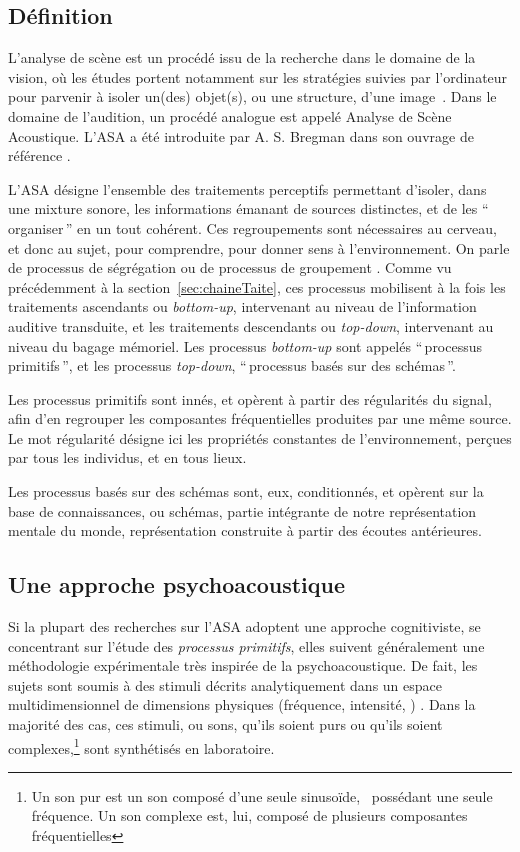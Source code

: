 
\subsection{Définition}
\label{sec:ASAintro}

L'analyse de scène est un procédé issu de la recherche dans le domaine de la vision, où les études portent notamment sur les stratégies suivies par l'ordinateur pour parvenir à isoler un(des) objet(s), ou une structure, d'une image~\citep[p. 12]{mcadams1994penser}. Dans le domaine de l'audition, un procédé analogue est appelé Analyse de Scène Acoustique. L'ASA a été introduite par A. S. Bregman dans son ouvrage de référence \citep{bregman1994auditory}.

L'ASA désigne l'ensemble des traitements perceptifs permettant d'isoler, dans une mixture sonore, les informations émanant de sources distinctes, et de les ``\,organiser\,'' en un tout cohérent. Ces regroupements sont nécessaires au cerveau, et donc au sujet, pour comprendre, pour donner sens à l'environnement. On parle de processus de ségrégation ou de processus de groupement \citep{winkler2009modeling}. Comme vu précédemment à la section~\ref{sec:chaineTaite}, ces processus mobilisent à la fois les traitements ascendants ou \emph{bottom-up}, intervenant au niveau de l'information auditive transduite, et les traitements descendants ou \emph{top-down}, intervenant au niveau du bagage mémoriel. Les processus \emph{bottom-up} sont appelés ``\,processus primitifs\,'', et les processus  \emph{top-down}, ``\,processus basés sur des schémas\,''. 

Les processus primitifs sont innés, et opèrent à partir des régularités du signal, afin d'en regrouper les composantes fréquentielles produites par une même source. Le mot régularité désigne ici les propriétés constantes de l'environnement, perçues par tous les individus, et en tous lieux.

Les processus basés sur des schémas sont, eux, conditionnés, et opèrent sur la base de connaissances, ou schémas, partie intégrante de notre représentation mentale du monde, représentation construite à partir des écoutes antérieures. 
 
\subsection{Une approche psychoacoustique}

Si la plupart des recherches sur l'ASA adoptent une approche cognitiviste, se concentrant sur l'étude des \emph{processus primitifs}, elles suivent généralement une méthodologie expérimentale très inspirée de la psychoacoustique. De fait, les sujets sont soumis à des stimuli décrits analytiquement dans un espace multidimensionnel de dimensions physiques (fréquence, intensité, \etc) \citep{dubois2006cognitive}. Dans la majorité des cas, ces stimuli, ou sons, qu'ils soient purs ou qu'ils soient complexes,\footnote{Un son pur est un son composé d'une seule sinusoïde, \ie~possédant une seule fréquence. Un son complexe est, lui, composé de plusieurs composantes fréquentielles} sont synthétisés en laboratoire.

